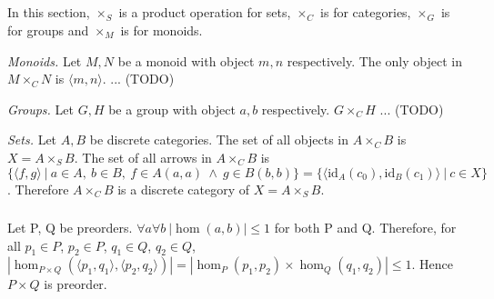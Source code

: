 \documentclass[luatex]{article}
\begin{document}
\subsection{}

\subsection{}

\subsection{}

\subsubsection{}



\showArt

In this section, $\times_S$ is a product operation for sets, $\times_C$ is for categories, $\times_G$ is for groups and $\times_M$ is for monoids.

\textit{Monoids.} Let $M, N$ be a monoid with object $m, n$ respectively. The only object in $M \times_C N$ is $\langle m, n \rangle$. ... (TODO)

\textit{Groups.} Let $G, H$ be a group with object $a, b$ respectively. $G \times_C H$ ... (TODO)

\textit{Sets.} Let $A, B$ be discrete categories. The set of all objects in $A \times_C B$ is $X = A \times_S B$. The set of all arrows in $A \times_C B$ is $\{\langle f, g \rangle\ |\ a \in A,\ b \in B,\ f \in A(a, a)\ \wedge\ g \in B(b, b)\} = \{\langle \mathrm{id}_A(c_0), \mathrm{id}_B(c_1) \rangle\ |\ c \in X\}$. Therefore  $A \times_C B$ is a discrete category of $X = A \times_S B$.

\subsubsection{}



\showArt

Let P, Q be preorders. $\forall a \forall b\ | \hom(a, b) | \leq 1$ for both P and Q. Therefore, for all $p_1 \in P$, $p_2 \in P$, $q_1 \in Q$, $q_2 \in Q$, $| \hom_{P \times Q}(\langle p_1, q_1 \rangle, \langle p_2, q_2 \rangle) | = | \hom_P(p_1, p_2) \times \hom_Q(q_1, q_2) | \leq 1$. Hence $P \times Q$ is preorder.

\subsubsection{}
\end{document}
